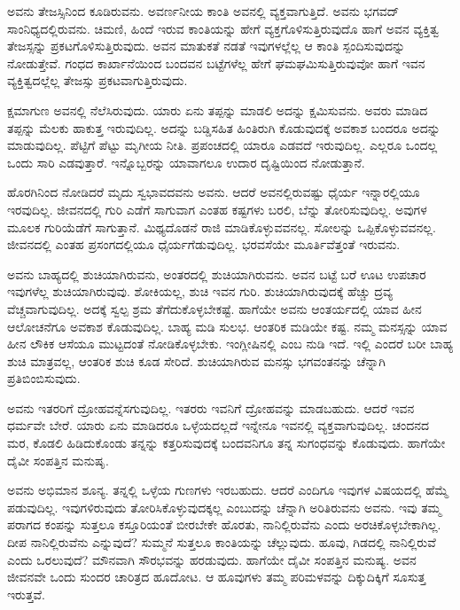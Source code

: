 ಅವನು ತೇಜಸ್ಸಿನಿಂದ ಕೂಡಿರುವನು. ಅವರ್ಣನೀಯ ಕಾಂತಿ ಅವನಲ್ಲಿ ವ್ಯಕ್ತವಾಗುತ್ತಿದೆ. ಅವನು ಭಗವದ್​ಸಾಂನಿಧ್ಯದಲ್ಲಿರುವನು. ಚಿಮಣಿ, ಹಿಂದೆ ಇರುವ ಕಾಂತಿಯನ್ನು ಹೇಗೆ ವ್ಯಕ್ತಗೊಳಿಸುತ್ತಿರುವುದೊ ಹಾಗೆ ಅವನ ವ್ಯಕ್ತಿತ್ವ ತೇಜಸ್ಸನ್ನು ಪ್ರಕಟಗೊಳಿಸುತ್ತಿರುವುದು. ಅವನ ಮಾತುಕತೆ ನಡತೆ ಇವುಗಳಲ್ಲೆಲ್ಲ ಆ ಕಾಂತಿ ಸ್ಪಂದಿಸುವುದನ್ನು ನೋಡುತ್ತೇವೆ. ಗಂಧದ ಕಾರ್ಖಾನೆಯಿಂದ ಬಂದವನ ಬಟ್ಟೆಗಳೆಲ್ಲ ಹೇಗೆ ಘಮಘಮಿಸುತ್ತಿರುವುವೋ ಹಾಗೆ ಇವನ ವ್ಯಕ್ತಿತ್ವದಲ್ಲೆಲ್ಲ ತೇಜಸ್ಸು ಪ್ರಕಟವಾಗುತ್ತಿರುವುದು.

ಕ್ಷಮಾಗುಣ ಅವನಲ್ಲಿ ನೆಲೆಸಿರುವುದು. ಯಾರು ಏನು ತಪ್ಪನ್ನು ಮಾಡಲಿ ಅದನ್ನು ಕ್ಷಮಿಸುವನು. ಅವರು ಮಾಡಿದ ತಪ್ಪನ್ನು ಮೆಲಕು ಹಾಕುತ್ತ ಇರುವುದಿಲ್ಲ. ಅದನ್ನು ಬಡ್ಡಿಸಹಿತ ಹಿಂತಿರುಗಿ ಕೊಡುವುದಕ್ಕೆ ಅವಕಾಶ ಬಂದರೂ ಅದನ್ನು ಮಾಡುವುದಿಲ್ಲ. ಪೆಟ್ಟಿಗೆ ಪೆಟ್ಟು ಮೃಗೀಯ ನೀತಿ. ಪ್ರಪಂಚದಲ್ಲಿ ಯಾರೂ ಎಡವದೆ ಇರುವುದಿಲ್ಲ. ಎಲ್ಲರೂ ಒಂದಲ್ಲ ಒಂದು ಸಾರಿ ಎಡವುತ್ತಾರೆ. ಇನ್ನೊಬ್ಬರನ್ನು ಯಾವಾಗಲೂ ಉದಾರ ದೃಷ್ಟಿಯಿಂದ ನೋಡುತ್ತಾನೆ.

ಹೊರಗಿನಿಂದ ನೋಡಿದರೆ ಮೃದು ಸ್ವಭಾವದವನು ಅವನು. ಆದರೆ ಅವನಲ್ಲಿರುವಷ್ಟು ಧೈರ್ಯ ಇನ್ನಾರಲ್ಲಿಯೂ ಇರವುದಿಲ್ಲ. ಜೀವನದಲ್ಲಿ ಗುರಿ ಎಡೆಗೆ ಸಾಗುವಾಗ ಎಂತಹ ಕಷ್ಟಗಳು ಬರಲಿ, ಬೆನ್ನು ತೋರಿಸುವುದಿಲ್ಲ. ಅವುಗಳ ಮೂಲಕ ಗುರಿಯೆಡೆಗೆ ಸಾಗುತ್ತಾನೆ. ಮಿಥ್ಯದೊಡನೆ ರಾಜಿ ಮಾಡಿಕೊಳ್ಳುವವನಲ್ಲ. ಸೋಲನ್ನು ಒಪ್ಪಿಕೊಳ್ಳುವವನಲ್ಲ. ಜೀವನದಲ್ಲಿ ಎಂತಹ ಪ್ರಸಂಗ\-ದಲ್ಲಿಯೂ ಧೈರ್ಯಗೆಡುವುದಿಲ್ಲ. ಭರವಸೆಯೇ ಮೂರ್ತಿವೆತ್ತಂತೆ ಇರುವನು.

ಅವನು ಬಾಹ್ಯದಲ್ಲಿ ಶುಚಿಯಾಗಿರುವನು, ಅಂತರದಲ್ಲಿ ಶುಚಿಯಾಗಿರುವನು. ಅವನ ಬಟ್ಟೆ ಬರೆ ಊಟ ಉಪಚಾರ ಇವುಗಳೆಲ್ಲ ಶುಚಿಯಾಗಿರುವುವು. ಶೋಕಿಯಲ್ಲ, ಶುಚಿ ಇವನ ಗುರಿ. ಶುಚಿಯಾಗಿರುವುದಕ್ಕೆ ಹೆಚ್ಚು ದ್ರವ್ಯ ವೆಚ್ಚವಾಗುವುದಿಲ್ಲ. ಅದಕ್ಕೆ ಸ್ವಲ್ಪ ಶ್ರಮ ತೆಗೆದುಕೊಳ್ಳಬೇಕಷ್ಟೆ. ಹಾಗೆಯೇ ಅವನು ಆಂತರ್ಯದಲ್ಲಿ ಯಾವ ಹೀನ ಆಲೋಚನೆಗೂ ಅವಕಾಶ ಕೊಡುವುದಿಲ್ಲ. ಬಾಹ್ಯ ಮಡಿ ಸುಲಭ. ಆಂತರಿಕ ಮಡಿಯೇ ಕಷ್ಟ. ನಮ್ಮ ಮನಸ್ಸನ್ನು ಯಾವ ಹೀನ ಲೌಕಿಕ ಆಸೆಯೂ ಮುಟ್ಟದಂತೆ ನೋಡಿಕೊಳ್ಳಬೇಕು. ಇಂಗ್ಲೀಷಿನಲ್ಲಿ ಎಂಬ ನುಡಿ ಇದೆ. ಇಲ್ಲಿ ಎಂದರೆ ಬರೀ ಬಾಹ್ಯ ಶುಚಿ ಮಾತ್ರವಲ್ಲ, ಆಂತರಿಕ ಶುಚಿ ಕೂಡ ಸೇರಿದೆ. ಶುಚಿಯಾಗಿರುವ ಮನಸ್ಸು ಭಗವಂತನನ್ನು ಚೆನ್ನಾಗಿ ಪ್ರತಿಬಿಂಬಿಸುವುದು.

ಅವನು ಇತರರಿಗೆ ದ್ರೋಹವನ್ನೆಸಗುವುದಿಲ್ಲ. ಇತರರು ಇವನಿಗೆ ದ್ರೋಹವನ್ನು ಮಾಡಬಹುದು. ಆದರೆ ಇವನ ಧರ್ಮವೇ ಬೇರೆ. ಯಾರು ಏನು ಮಾಡಿದರೂ ಒಳ್ಳೆಯದಲ್ಲದೆ ಇನ್ನೇನೂ ಇವನಲ್ಲಿ ವ್ಯಕ್ತವಾಗುವುದಿಲ್ಲ. ಚಂದನದ ಮರ, ಕೊಡಲಿ ಹಿಡಿದುಕೊಂಡು ತನ್ನನ್ನು ಕತ್ತರಿಸುವುದಕ್ಕೆ ಬಂದವನಿಗೂ ತನ್ನ ಸುಗಂಧವನ್ನು ಕೊಡುವುದು. ಹಾಗೆಯೇ ದೈವೀ ಸಂಪತ್ತಿನ ಮನುಷೃ.

ಅವನು ಅಭಿಮಾನ ಶೂನ್ಯ. ತನ್ನಲ್ಲಿ ಒಳ್ಳೆಯ ಗುಣಗಳು ಇರಬಹುದು. ಆದರೆ ಎಂದಿಗೂ ಇವುಗಳ ವಿಷಯದಲ್ಲಿ ಹೆಮ್ಮೆ ಪಡುವುದಿಲ್ಲ. ಇವುಗಳಿರುವುದು ತೋರಿಸಿಕೊಳ್ಳುವುದಕ್ಕಲ್ಲ ಎಂಬು\-ದನ್ನು ಚೆನ್ನಾಗಿ ಅರಿತಿರುವನು ಅವನು. ಇವು ತಮ್ಮ ಪರಾಗದ ಕಂಪನ್ನು ಸುತ್ತಲೂ ಕಸ್ತೂರಿಯಂತೆ ಬೀರಬೇಕೇ ಹೊರತು, ನಾನಿಲ್ಲಿರುವೆನು ಎಂದು ಅರಚಿಕೊಳ್ಳಬೇಕಾಗಿಲ್ಲ. ದೀಪ ನಾನಿಲ್ಲಿರುವೆನು ಎನ್ನುವುದೆ? ಸುಮ್ಮನೆ ಸುತ್ತಲೂ ಕಾಂತಿಯನ್ನು ಚೆಲ್ಲುವುದು. ಹೂವು, ಗಿಡದಲ್ಲಿ ನಾನಿಲ್ಲಿರುವೆ ಎಂದು ಒರಲುವುದೆ? ಮೌನವಾಗಿ ಸೌರಭವನ್ನು ಹರಡುವುದು. ಹಾಗೆಯೇ ದೈವೀ ಸಂಪತ್ತಿನ ಮನುಷ್ಯ. ಅವನ ಜೀವನವೇ ಒಂದು ಸುಂದರ ಚಾರಿತ್ರದ ಹೂದೋಟ. ಆ ಹೂವುಗಳು ತಮ್ಮ ಪರಿಮಳವನ್ನು ದಿಕ್ಕುದಿಕ್ಕಿಗೆ ಸೂಸುತ್ತ ಇರುತ್ತವೆ.

